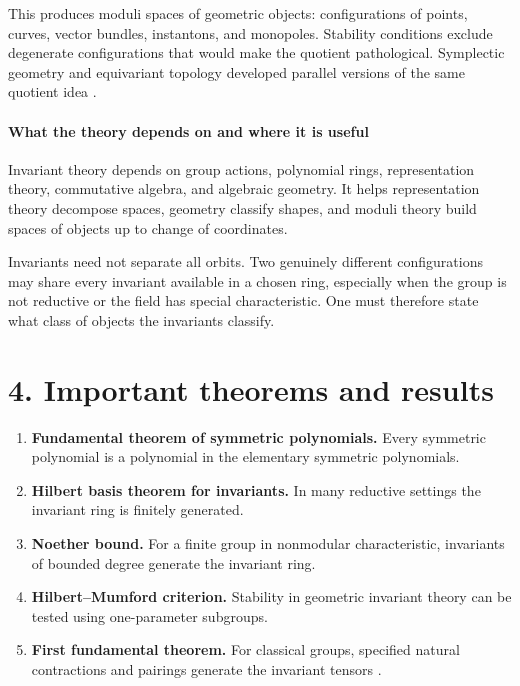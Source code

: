 This produces moduli spaces of geometric objects: configurations of points, curves, vector bundles, instantons, and monopoles. Stability conditions exclude degenerate configurations that would make the quotient pathological. Symplectic geometry and equivariant topology developed parallel versions of the same quotient idea \cite{invariant_theory_ref3}.

\paragraph{What the theory depends on and where it is useful}
Invariant theory depends on group actions, polynomial rings, representation theory, commutative algebra, and algebraic geometry. It helps representation theory decompose spaces, geometry classify shapes, and moduli theory build spaces of objects up to change of coordinates.

Invariants need not separate all orbits. Two genuinely different configurations may share every invariant available in a chosen ring, especially when the group is not reductive or the field has special characteristic. One must therefore state what class of objects the invariants classify.

\section*{4. Important theorems and results}
\begin{enumerate}[leftmargin=*,itemsep=0.35em]
\item \textbf{Fundamental theorem of symmetric polynomials.} Every symmetric polynomial is a polynomial in the elementary symmetric polynomials.

\item \textbf{Hilbert basis theorem for invariants.} In many reductive settings the invariant ring is finitely generated.

\item \textbf{Noether bound.} For a finite group in nonmodular characteristic, invariants of bounded degree generate the invariant ring.

\item \textbf{Hilbert--Mumford criterion.} Stability in geometric invariant theory can be tested using one-parameter subgroups.

\item \textbf{First fundamental theorem.} For classical groups, specified natural contractions and pairings generate the invariant tensors \cite{invariant_theory_ref4}.
\end{enumerate}

